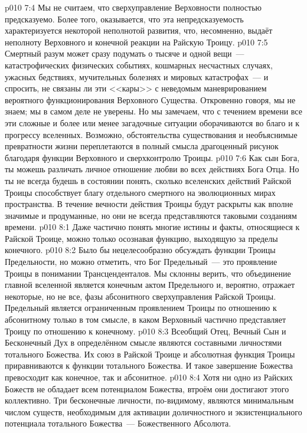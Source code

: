 \vs p010 7:4 \pc Мы не считаем, что сверхуправление Верховности полностью предсказуемо. Более того, оказывается, что эта непредсказуемость характеризуется некоторой неполнотой развития, что, несомненно, выдаёт неполноту Верховного и конечной реакции на Райскую Троицу.
\vs p010 7:5 Смертный разум может сразу подумать о тысяче и одной вещи~--- катастрофических физических событиях, кошмарных несчастных случаях, ужасных бедствиях, мучительных болезнях и мировых катастрофах~--- и спросить, не связаны ли эти <<кары>> с неведомым маневрированием вероятного функционирования Верховного Существа. Откровенно говоря, мы не знаем; мы в самом деле не уверены. Но мы замечаем, что с течением времени все эти сложные и более или менее загадочные ситуации  оборачиваются во благо и к прогрессу вселенных. Возможно, обстоятельства существования и необъяснимые превратности жизни переплетаются в полный смысла драгоценный рисунок благодаря функции Верховного и сверхконтролю Троицы.
\vs p010 7:6 Как сын Бога, ты можешь различать личное отношение любви во всех действиях Бога Отца. Но ты не всегда будешь в состоянии понять, сколько вселенских действий Райской Троицы способствует благу отдельного смертного на эволюционных мирах пространства. В течение вечности действия Троицы будут раскрыты как вполне значимые и продуманные, но они не всегда представляются таковыми созданиям времени.
\vs p010 8:1 Даже частично понять многие истины и факты, относящиеся к Райской Троице, можно только осознавая функцию, выходящую за пределы конечного.
\vs p010 8:2 Было бы нецелесообразно обсуждать функции Троицы Предельности, но можно отметить, что Бог Предельный~--- это проявление Троицы в понимании Трансценденталов. Мы склонны верить, что объединение главной вселенной является конечным актом Предельного и, вероятно, отражает некоторые, но не все, фазы абсонитного сверхуправления Райской Троицы. Предельный является ограниченным проявлением Троицы по отношению к абсонитному только в том смысле, в каком Верховный частично представляет Троицу по отношению к конечному.
\vs p010 8:3 \pc Всеобщий Отец, Вечный Сын и Бесконечный Дух в определённом смысле являются составными личностями тотального Божества. Их союз в Райской Троице и абсолютная функция Троицы приравниваются к функции тотального Божества. И такое завершение Божества превосходит как конечное, так и абсонитное.
\vs p010 8:4 Хотя ни одно из Райских Божеств не обладает всем потенциалом Божества, втроём они достигают этого коллективно. Три бесконечные личности, по\hyp{}видимому, являются минимальным числом существ, необходимым для активации доличностного и экзистенциального потенциала тотального Божества~--- Божественного Абсолюта.
